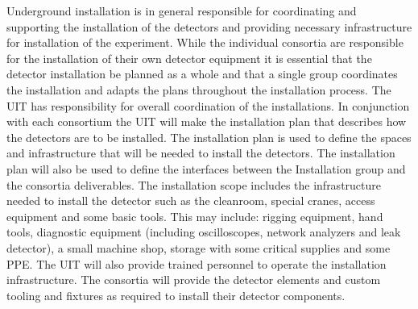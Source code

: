 Underground installation is in general responsible for coordinating
and supporting the installation of the detectors and providing
necessary infrastructure for installation of the experiment. While the individual
consortia are responsible for the installation of their own detector
equipment it is essential that the detector installation be planned
as a whole and that a single group coordinates the installation and
adapts the plans throughout the installation process. The UIT has 
responsibility for overall coordination of the installations. In
conjunction with each consortium the UIT will make the installation
plan that describes how the detectors are to be installed. The
installation plan is used to define the spaces and infrastructure that
will be needed to install the detectors. The installation plan will
also be used to define the interfaces between the Installation group
and the consortia deliverables.  The installation scope includes the
infrastructure needed to install the detector such as the cleanroom,
special cranes, access equipment and some basic tools.
This may include: rigging equipment, hand tools, diagnostic equipment
(including oscilloscopes, network analyzers and leak detector), a
small machine shop, storage with some critical supplies and some PPE.                        
The UIT will also
provide trained personnel to operate the installation
infrastructure. The consortia will provide the detector elements and
custom tooling and fixtures as required to install their detector
components.


 




